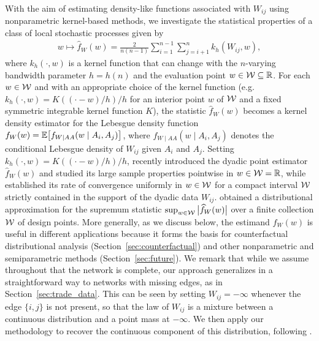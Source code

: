 With the aim of estimating density-like functions
associated with $W_{ij}$ using
nonparametric kernel-based methods,
we investigate the statistical properties of a class
of local stochastic processes given by
%
\begin{align}\label{eq:kernel_estimator}
  w \mapsto \widehat{f}_W(w)
  = \frac{2}{n(n-1)} \sum_{i=1}^{n-1} \sum_{j=i+1}^n k_h(W_{ij},w),
\end{align}
%
where $k_h(\cdot,w)$ is a kernel function
that can change with the $n$-varying bandwidth parameter
$h=h(n)$ and the evaluation point
$w \in \mathcal{W}\subseteq \mathbb{R}$. For each $w\in\mathcal{W}$ and with an appropriate choice of
the kernel function
(e.g.\ $k_h(\cdot,w)=K((\cdot-w)/h)/h$ for an interior point $w$
of $\mathcal{W}$ and a fixed symmetric integrable kernel function $K$),
the statistic $\widehat{f}_W(w)$ becomes a kernel density estimator
for the Lebesgue density function
$f_W(w) = \mathbb{E}\big[f_{W \mid AA}(w \mid A_i,A_j)\big]$,
where $f_{W \mid AA}(w \mid A_i,A_j)$ denotes the conditional Lebesgue density
of $W_{ij}$ given $A_i$ and $A_j$.
Setting
$k_h(\cdot,w)=K((\cdot-w)/h)/h$, \citet{graham2022kernel}
recently introduced the dyadic point estimator $\widehat{f}_W(w)$ and studied
its large sample properties pointwise in $w\in\mathcal{W}=\mathbb{R}$, while
\citet{chiang2020empirical} established its rate of convergence uniformly in
$w\in\mathcal{W}$ for a compact interval $\mathcal{W}$ strictly contained in the support of
the dyadic data $W_{ij}$.
\citet{chiang2022inference} obtained a distributional approximation for the
supremum statistic $\sup_{w\in\mathcal{W}}\big|\widehat{f}_W(w)\big|$
over a finite collection $\mathcal{W}$ of design points.
More generally, as we discuss below,
the estimand $f_W(w)$ is useful in
different applications because it forms the basis for
counterfactual distributional analysis
(Section~\ref{sec:counterfactual})
and other nonparametric and semiparametric methods
(Section~\ref{sec:future}).
We remark that while we assume throughout that the network is complete,
our approach generalizes in a straightforward way to networks
with missing edges, as in Section~\ref{sec:trade_data}.
This can be seen by setting $W_{ij} = -\infty$
whenever the edge $\{i, j\}$ is not present, so that the law of
$W_{ij}$ is a mixture between a continuous distribution and a point mass
at $-\infty$.
We then apply our methodology to recover the
continuous component of this distribution,
following \citet{chiang2022inference}.

